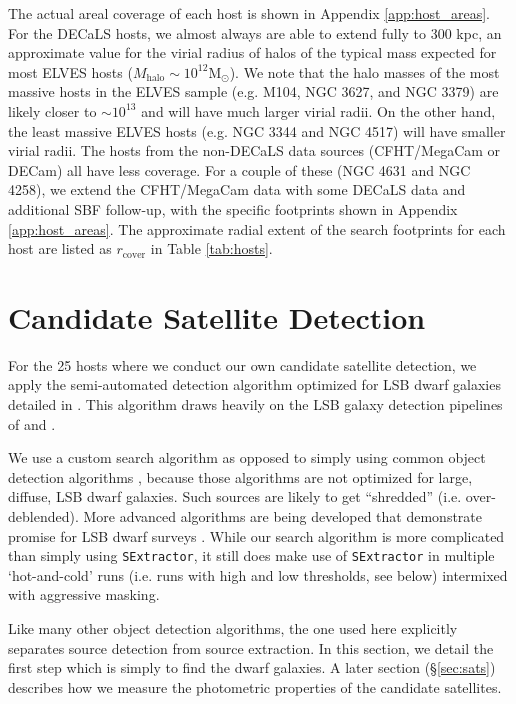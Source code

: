 \documentclass[twocolumn]{aastex62}
\newcommand{\msun}{M$_\odot$}
\begin{document}
The actual areal coverage of each host is shown in Appendix \ref{app:host_areas}. For the DECaLS hosts, we almost always are able to extend fully to 300 kpc, an approximate value for the virial radius of halos of the typical mass expected for most ELVES hosts ($M_\mathrm{halo}\sim10^{12}$\msun). We note that the halo masses of the most massive hosts in the ELVES sample (e.g. M104, NGC 3627, and NGC 3379) are likely closer to $\sim10^{13}$ \citep{karachentsev2014_masses, kourkchi2017} and will have much larger virial radii. On the other hand, the least massive ELVES hosts (e.g. NGC 3344 and NGC 4517) will have smaller virial radii. The hosts from the non-DECaLS data sources (CFHT/MegaCam or DECam) all have less coverage. For a couple of these (NGC 4631 and NGC 4258), we extend the CFHT/MegaCam data with some DECaLS data and additional SBF follow-up, with the specific footprints shown in Appendix \ref{app:host_areas}. The approximate radial extent of the search footprints for each host are listed as $r_\mathrm{cover}$ in Table \ref{tab:hosts}. 






\section{Candidate Satellite Detection}
\label{sec:detection}

For the 25 hosts where we conduct our own candidate satellite detection, we apply the semi-automated detection algorithm optimized for LSB dwarf galaxies detailed in \citet{carlsten2020a}. This algorithm draws heavily on the LSB galaxy detection pipelines of \citet{bennet2017} and \citet{greco2018}. 

We use a custom search algorithm as opposed to simply using common object detection algorithms \citep[e.g. \texttt{SExtractor},][]{sextractor}, because those algorithms are not optimized for large, diffuse, LSB dwarf galaxies. Such sources are likely to get ``shredded'' (i.e. over-deblended). More advanced algorithms \citep[e.g.][]{noise_chisel, lang2016, profound, melchior2018, haigh2021} are being developed that demonstrate promise for LSB dwarf surveys \citep{venhola2021}. While our search algorithm is more complicated than simply using \texttt{SExtractor}, it still does make use of \texttt{SExtractor} in multiple `hot-and-cold' runs (i.e. runs with high and low thresholds, see below) intermixed with aggressive masking. 

Like many other object detection algorithms, the one used here explicitly separates source detection from source extraction. In this section, we detail the first step which is simply to find the dwarf galaxies. A later section (\S\ref{sec:sats}) describes how we measure the photometric properties of the candidate satellites. 
\end{document}
